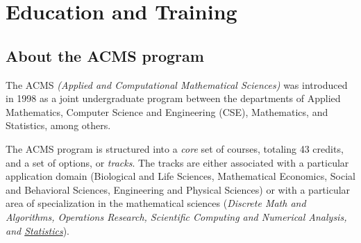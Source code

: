 \section{Education and Training}
\label{sec:education}
\subsection{\bf About the ACMS program}

The ACMS {\em (Applied and Computational Mathematical Sciences)} was
introduced in 1998 as a joint undergraduate program between the
departments of Applied Mathematics, Computer Science and Engineering
(CSE), Mathematics, and Statistics, among others.

The ACMS program is structured into a {\em core} set of courses,
totaling 43 credits, and a set of options, or {\em tracks}. The tracks
are either associated with a particular application domain (Biological
and Life Sciences, Mathematical Economics, Social and Behavioral
Sciences, Engineering and Physical Sciences) or with a particular area
of specialization in the mathematical sciences ({\em Discrete Math and
  Algorithms, Operations Research, Scientific Computing and Numerical
  Analysis, and \underline{Statistics}}).

